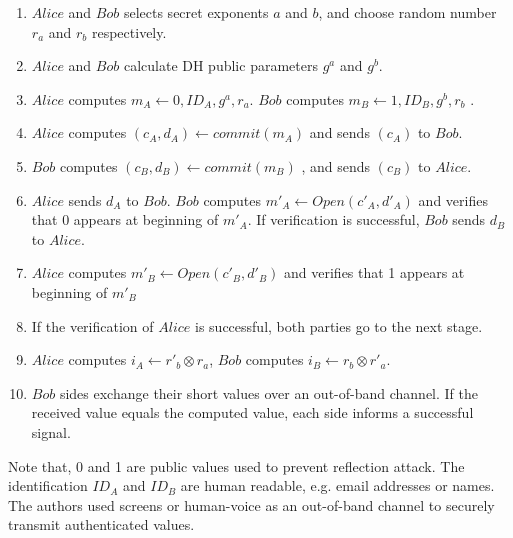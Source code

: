 \begin{enumerate}
\item $Alice$ and $Bob$ selects secret exponents $a$ and $b$, and choose random number $r_a$ and $r_b$ respectively. 
\item $Alice$ and $Bob$ calculate DH public parameters $g^a$ and $g^b$. 
\item $Alice$ computes $m_A \leftarrow 0,ID_A,g^a,r_a$. $Bob$ computes $m_B \leftarrow 1,ID_B,g^b,r_b$ .
\item $Alice$ computes $(c_A,d_A) \leftarrow commit(m_A)$ and sends $(c_A)$ to $Bob$.
\item $Bob$ computes $(c_B,d_B) \leftarrow commit(m_B)$ , and sends $(c_B)$ to $Alice$.
\item $Alice$ sends $d_A$ to $Bob$. $Bob$ computes $m'_A \leftarrow Open(c'_A,d'_A)$ and verifies that 0 appears at beginning of $m'_A$. If verification is successful, $Bob$ sends $d_B$ to $Alice$.
\item $Alice$ computes $m'_B \leftarrow Open(c'_B,d'_B)$ and verifies that 1 appears at beginning of $m'_B$
 \item If the verification of $Alice$ is successful, both parties go to the next stage.
\item $Alice$ computes $i_A \leftarrow r'_b \otimes r_a$, $Bob$ computes $i_B \leftarrow r_b \otimes r'_a$.
\item $Bob$ sides exchange their short values over an out-of-band channel. If the received value equals the computed value, each side informs a successful signal. 
\end{enumerate}

Note that, 0 and 1 are public values used to prevent reflection attack. The identification $ID_A$ and $ID_B$ are human readable, e.g. email addresses or names. The authors used screens or human-voice as an out-of-band channel to securely transmit authenticated values.
 
